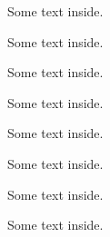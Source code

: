 \documentclass{article}
\begin{document}
\begin{framedd}
\bcbombe \tcblower Some text inside.
\end{framedd}
\begin{framedd}[colback=blue!40!green]
\bclampe \tcblower Some text inside.
\end{framedd}
\begin{framedd}
\bcattention \bcinterdit \tcblower
Some text inside.
\end{framedd}
\begin{framedd}[colback=blue!40!green]
\bcnucleaire \tcblower
Some text inside.
\end{framedd}
\begin{framedd}[colback=blue!40!green]
\bcdanger \tcblower
Some text inside.
\end{framedd}
\begin{framedd}
\bcquestion \tcblower
Some text inside.
\end{framedd}
\begin{framedd}[colback=blue!40!green, lefthand width=2.5cm]
\bcsoleil \bceclaircie \bcpluie \bcneige \tcblower
Some text inside.
\end{framedd}
\begin{framedd}[lefthand width=3cm]
\bccube \bcdodecaedre \bcicosaedre \bcoctaedre \bctetraedre \tcblower
Some text inside.
\end{framedd}
\end{document}
